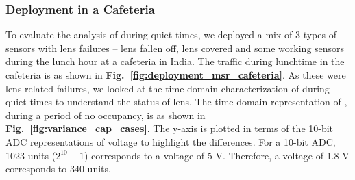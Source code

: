 



\subsubsection{Deployment in a Cafeteria}\label{subsubsec:cafeteria} To evaluate the analysis of \aout during quiet times, we deployed a mix of 3 types of sensors with lens failures -- lens fallen off, lens covered and some working sensors during the lunch hour at a cafeteria in India. The traffic during lunchtime in the cafeteria is as shown in {\bfseries Fig.~\ref{fig:deployment_msr_cafeteria}}. As these were lens-related failures, we looked at the time-domain characterization of \aout during quiet times to understand the status of lens. The time domain representation of \aout, during a period of no occupancy, is as shown in {\bfseries Fig.~\ref{fig:variance_cap_cases}}. The y-axis is plotted in terms of the 10-bit ADC representations of voltage to highlight the differences. For a 10-bit ADC, 1023 units (\ie $2^{10} - 1$) corresponds to a voltage of 5 V. Therefore, a voltage of 1.8 V corresponds to 340 units. 

